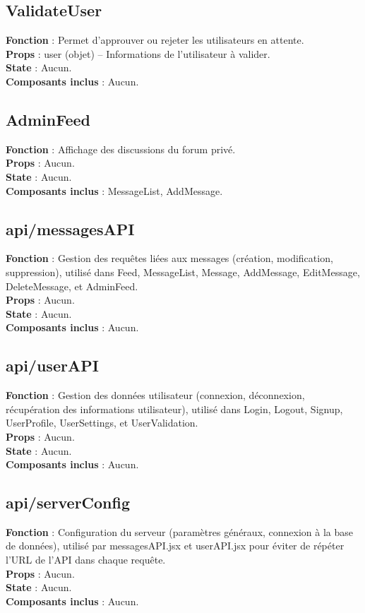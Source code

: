 \documentclass{article}
\begin{document}
\subsection*{ValidateUser}
\textbf{Fonction} : Permet d’approuver ou rejeter les utilisateurs en attente.\\
\textbf{Props} : user (objet) – Informations de l’utilisateur à valider.\\
\textbf{State} : Aucun.\\
\textbf{Composants inclus} : Aucun.

\subsection*{AdminFeed}
\textbf{Fonction} : Affichage des discussions du forum privé.\\
\textbf{Props} : Aucun.\\
\textbf{State} : Aucun.\\
\textbf{Composants inclus} : MessageList, AddMessage.

\subsection*{api/messagesAPI}
\textbf{Fonction} : Gestion des requêtes liées aux messages (création, modification, suppression), utilisé dans Feed, MessageList, Message, AddMessage, EditMessage, DeleteMessage, et AdminFeed.\\
\textbf{Props} : Aucun.\\
\textbf{State} : Aucun.\\
\textbf{Composants inclus} : Aucun.

\subsection*{api/userAPI}
\textbf{Fonction} : Gestion des données utilisateur (connexion, déconnexion, récupération des informations utilisateur), utilisé dans Login, Logout, Signup, UserProfile, UserSettings, et UserValidation.\\
\textbf{Props} : Aucun.\\
\textbf{State} : Aucun.\\
\textbf{Composants inclus} : Aucun.

\subsection*{api/serverConfig}
\textbf{Fonction} : Configuration du serveur (paramètres généraux, connexion à la base de données), utilisé par messagesAPI.jsx et userAPI.jsx pour éviter de répéter l’URL de l’API dans chaque requête.\\
\textbf{Props} : Aucun.\\
\textbf{State} : Aucun.\\
\textbf{Composants inclus} : Aucun.
\end{document}

